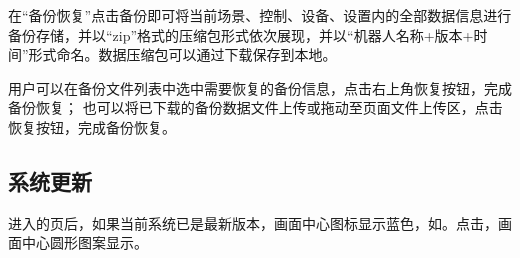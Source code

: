 在“备份恢复”点击备份即可将当前场景、控制、设备、设置内的全部数据信息进行备份存储，并以“zip”格式的压缩包形式依次展现，并以“机器人名称+版本+时间”形式命名。数据压缩包可以通过下载保存到本地。

用户可以在备份文件列表中选中需要恢复的备份信息，点击右上角恢复按钮，完成备份恢复；
也可以将已下载的备份数据文件上传或拖动至页面文件上传区，点击恢复按钮，完成备份恢复。




\subsection{系统更新}

进入的页后，如果当前系统已是最新版本，画面中心图标显示蓝色，如。点击，画面中心圆形图案显示。

